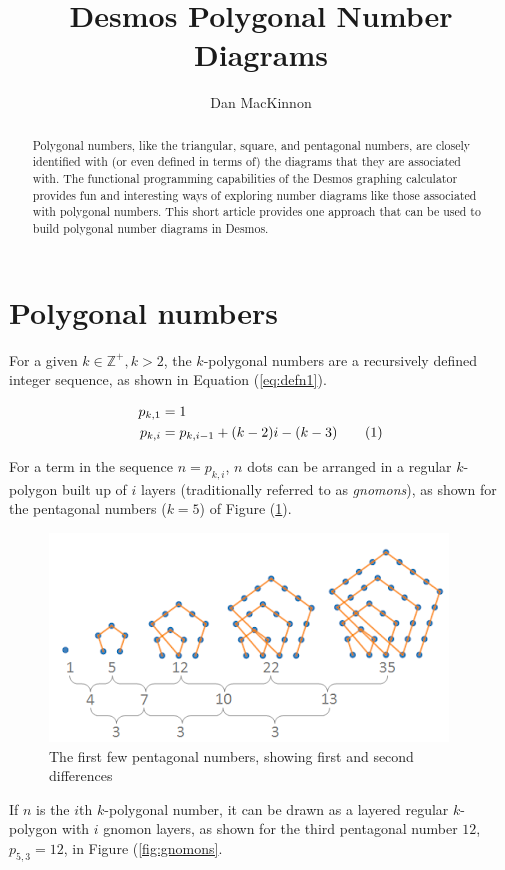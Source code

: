 \documentclass[notitlepage]{report}
\title{Desmos Polygonal Number Diagrams}
\author{Dan MacKinnon}
\newcommand\numberthis{\addtocounter{equation}{1}\tag{\theequation}}
\begin{document}
\maketitle
\begin{abstract}
\noindent
Polygonal numbers, like the triangular, square, and pentagonal numbers, are closely identified with (or even defined in terms of) the diagrams that they are associated with. The functional programming capabilities of the Desmos graphing calculator provides fun and interesting ways of exploring number diagrams like those associated with polygonal numbers. This short article provides one approach that can be used to build polygonal number diagrams in Desmos.  
\end{abstract}

\section*{Polygonal numbers}
For a given $k \in \mathbb{Z}^+, k>2$, the $k$-polygonal numbers are a recursively defined integer sequence, as shown in Equation (\ref{eq:defn1}). 

\begin{align*}
    p_{k, 1} &= 1 \\
    p_{k,i} &= p_{k,i-1} + (k-2)i - (k-3)
    \numberthis
    \label{eq:defn1}
\end{align*}

For a term in the sequence $n = p_{k,i}$, $n$ dots can be arranged in a regular $k$-polygon built up of $i$ layers (traditionally referred to as \textit{gnomons}), as shown for the pentagonal numbers ($k=5$) of Figure (\ref{fig:pentagonals}). 

\begin{figure}[!htb]
    \centering
    \includegraphics[width=0.5\linewidth]{pentagonal_numbers.PNG}
    \caption{The first few pentagonal numbers, showing first and second differences}
    \label{fig:pentagonals}
\end{figure}

If $n$ is the $i$th $k$-polygonal number, it can be drawn as a layered regular $k$-polygon with $i$ gnomon layers, as shown for the third pentagonal number $12$, $p_{5,3}=12$, in Figure (\ref{fig:gnomons}.
\end{document}
